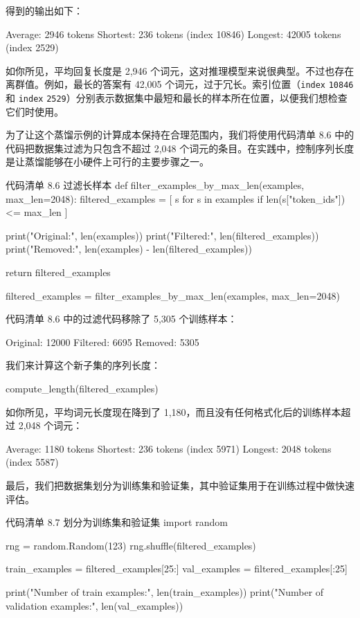 得到的输出如下：

\begin{codebox}
Average: 2946 tokens
Shortest: 236 tokens (index 10846)
Longest: 42005 tokens (index 2529)
\end{codebox}

如你所见，平均回复长度是 2,946 个词元，这对推理模型来说很典型。不过也存在离群值。例如，最长的答案有 42,005 个词元，过于冗长。索引位置（\texttt{index} \texttt{10846} 和 \texttt{index} \texttt{2529}）分别表示数据集中最短和最长的样本所在位置，以便我们想检查它们时使用。

为了让这个蒸馏示例的计算成本保持在合理范围内，我们将使用代码清单 8.6 中的代码把数据集过滤为只包含不超过 2,048 个词元的条目。在实践中，控制序列长度是让蒸馏能够在小硬件上可行的主要步骤之一。

\begin{codeboxt}{代码清单 8.6 过滤长样本}
def filter_examples_by_max_len(examples, max_len=2048):
    filtered_examples = [
        s for s in examples
        if len(s["token_ids"]) <= max_len
    ]

    print("Original:", len(examples))
    print("Filtered:", len(filtered_examples))
    print("Removed:", len(examples) - len(filtered_examples))

    return filtered_examples

filtered_examples = filter_examples_by_max_len(examples, max_len=2048)
\end{codeboxt}

代码清单 8.6 中的过滤代码移除了 5,305 个训练样本：

\begin{codebox}
Original: 12000
Filtered: 6695
Removed: 5305
\end{codebox}

我们来计算这个新子集的序列长度：

\begin{codebox}
compute_length(filtered_examples)
\end{codebox}

如你所见，平均词元长度现在降到了 1,180，而且没有任何格式化后的训练样本超过 2,048 个词元：

\begin{codebox}
Average: 1180 tokens
Shortest: 236 tokens (index 5971)
Longest: 2048 tokens (index 5587)
\end{codebox}

最后，我们把数据集划分为训练集和验证集，其中验证集用于在训练过程中做快速评估。

\begin{codeboxt}{代码清单 8.7 划分为训练集和验证集}
import random

rng = random.Random(123)
rng.shuffle(filtered_examples)

train_examples = filtered_examples[25:]
val_examples = filtered_examples[:25]

print("Number of train examples:", len(train_examples))
print("Number of validation examples:", len(val_examples))
\end{codeboxt}

